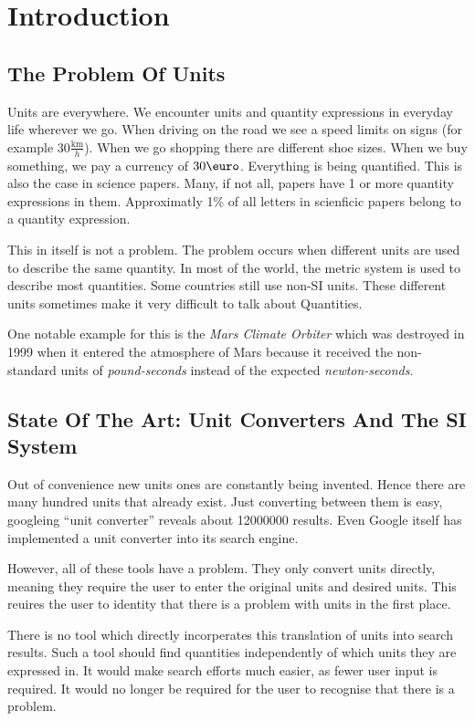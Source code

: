 \section{Introduction}

\subsection{The Problem Of Units}

Units are everywhere. We encounter units and quantity expressions in everyday life wherever we go. When driving on the road we see a speed limits on signs (for example $30 \frac{\text{km}}{h}$). When we go shopping there are different shoe sizes. When we buy something, we pay a currency of $30 \text{\euro}$. Everything is being quantified. This is also the case in science papers. Many, if not all, papers have 1 or more quantity expressions in them. Approximatly 1\% of all letters in scienficic papers belong to a quantity expression.

This in itself is not a problem. The problem occurs when different units are used to describe the same quantity. In most of the world, the metric system is used to describe most quantities. Some countries still use non-SI units. These different units sometimes make it very difficult to talk about Quantities.

One notable example for this is the \textit{Mars Climate Orbiter} which was destroyed in 1999 when it entered the atmosphere of Mars because it received the non-standard units of \textit{pound-seconds} instead of the expected \textit{newton-seconds}\cite{nasa:mcor}.

\subsection{State Of The Art: Unit Converters And The SI System}

Out of convenience new units ones are constantly being invented. Hence there are many hundred units that already exist. Just converting between them is easy, googleing ``unit converter'' reveals about 12000000 results. Even Google itself has implemented a unit converter into its search engine.

However, all of these tools have a problem. They only convert units directly, meaning they require the user to enter the original units and desired units. This reuires the user to identity that there is a problem with units in the first place.

There is no tool which directly incorperates this translation of units into search results. Such a tool should find quantities independently of which units they are expressed in. It would make search efforts much easier, as fewer user input is required. It would no longer be required for the user to recognise that there is a problem.

